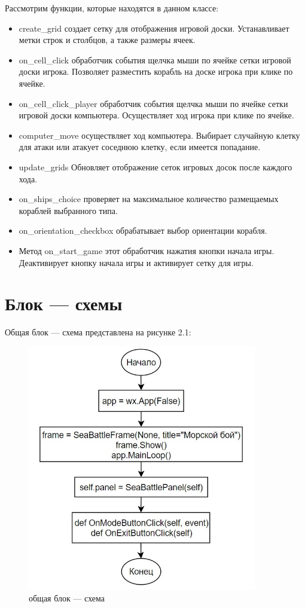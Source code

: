 Рассмотрим функции, которые находятся в данном классе:
\begin{itemize}
    \item create\_grid создает сетку для отображения игровой доски. Устанавливает метки строк и столбцов, а также размеры ячеек.
    \item on\_cell\_click обработчик события щелчка мыши по ячейке сетки игровой доски игрока. Позволяет разместить корабль на доске игрока при клике по ячейке.
    \item on\_cell\_click\_player обработчик события щелчка мыши по ячейке сетки игровой доски компьютера. Осуществляет ход игрока при клике по ячейке.
    \item computer\_move осуществляет ход компьютера. Выбирает случайную клетку для атаки или атакует соседнюю клетку, если имеется попадание.
    \item update\_grids Обновляет отображение сеток игровых досок после каждого хода.
    \item on\_ships\_choice проверяет на максимальное количество размещаемых кораблей выбранного типа.
    \item on\_orientation\_checkbox обрабатывает выбор ориентации корабля.
    \item Метод on\_start\_game этот обработчик нажатия кнопки начала игры. Деактивирует кнопку начала игры и активирует сетку для игры.
\end{itemize}
\section{\label{sec:ch02/sec06}Блок --- схемы}
Общая блок --- схема представлена на рисунке 2.1:
\begin{figure}[H]
\graphicspath{ {img/} }
\centering
\includegraphics[width = 10cm]{общая.jpg}
\caption{общая блок --- схема}
\end{figure}

